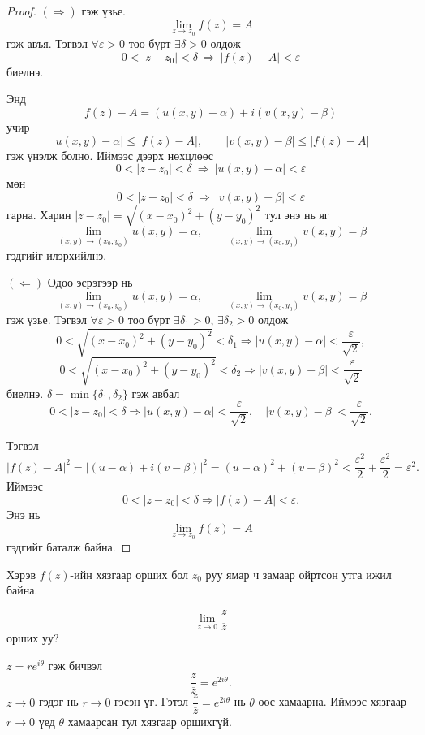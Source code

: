 \begin{proof}
$(\Rightarrow)$ гэж үзье. 
\[
\lim_{z\to z_0} f(z)=A
\]
гэж авъя. Тэгвэл $\forall \varepsilon>0$ тоо бүрт $\exists \delta>0$ олдож
\[
0<|z-z_0|<\delta \ \Rightarrow\ |f(z)-A|<\varepsilon
\]
биелнэ.

Энд
\[
f(z)-A=(u(x,y)-\alpha)+i(v(x,y)-\beta)
\]
учир
\[
|u(x,y)-\alpha|\le |f(z)-A|,\qquad |v(x,y)-\beta|\le |f(z)-A|
\]
гэж үнэлж болно. Иймээс дээрх нөхцлөөс
\[
0<|z-z_0|<\delta \ \Rightarrow\ |u(x,y)-\alpha|<\varepsilon
\]
мөн
\[
0<|z-z_0|<\delta \ \Rightarrow\ |v(x,y)-\beta|<\varepsilon
\]
гарна. Харин $|z-z_0|=\sqrt{(x-x_0)^2+(y-y_0)^2}$ тул энэ нь яг
\[
\lim_{(x,y)\to(x_0,y_0)}u(x,y)=\alpha,\qquad
\lim_{(x,y)\to(x_0,y_0)}v(x,y)=\beta
\]
гэдгийг илэрхийлнэ.

$(\Leftarrow)$ Одоо эсрэгээр нь
\[
\lim_{(x,y)\to(x_0,y_0)}u(x,y)=\alpha,\qquad
\lim_{(x,y)\to(x_0,y_0)}v(x,y)=\beta
\]
гэж үзье. Тэгвэл $\forall \varepsilon>0$ тоо бүрт $\exists \delta_1>0$, $\exists \delta_2>0$ олдож
\[
0<\sqrt{(x-x_0)^2+(y-y_0)^2}<\delta_1 \Rightarrow |u(x,y)-\alpha|<\frac{\varepsilon}{\sqrt2},
\]
\[
0<\sqrt{(x-x_0)^2+(y-y_0)^2}<\delta_2 \Rightarrow |v(x,y)-\beta|<\frac{\varepsilon}{\sqrt2}
\]
биелнэ. $\delta=\min\{\delta_1,\delta_2\}$ гэж авбал
\[
0<|z-z_0|<\delta \Rightarrow 
|u(x,y)-\alpha|<\frac{\varepsilon}{\sqrt2},\quad
|v(x,y)-\beta|<\frac{\varepsilon}{\sqrt2}.
\]

Тэгвэл
\[
|f(z)-A|^2
=
|(u-\alpha)+i(v-\beta)|^2
=
(u-\alpha)^2+(v-\beta)^2
<
\frac{\varepsilon^2}{2}+\frac{\varepsilon^2}{2}
=\varepsilon^2.
\]
Иймээс
\[
0<|z-z_0|<\delta \Rightarrow |f(z)-A|<\varepsilon.
\]
Энэ нь
\[
\lim_{z\to z_0} f(z)=A
\]
гэдгийг баталж байна.
\end{proof}


\begin{sen}
Хэрэв $f(z)$-ийн хязгаар орших бол $z_0$ руу ямар ч замаар ойртсон
утга ижил байна.
\end{sen}

\begin{exm}
\[
\lim_{z\to 0} \frac{z}{\overline{z}}
\]
орших уу?
\end{exm}

\begin{sol}
$z=re^{i\theta}$ гэж бичвэл
\[
\frac{z}{\overline{z}}=e^{2i\theta}.
\]
$z\to 0$ гэдэг нь $r\to 0$ гэсэн үг. Гэтэл $\dfrac{z}{\overline{z}}=e^{2i\theta}$
нь $\theta$-оос хамаарна. Иймээс хязгаар $r\to 0$ үед $\theta$ хамаарсан тул хязгаар оршихгүй.
\end{sol}

